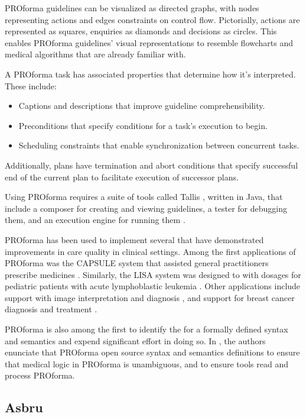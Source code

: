 PROforma guidelines can be visualized as directed graphs, with nodes representing
actions and edges constraints on control flow. Pictorially,
actions are represented as squares, enquiries as diamonds and
decisions as circles. This enables PROforma guidelines' visual representations
to resemble flowcharts and medical algorithms that \HCPs{} are already familiar
with.

A PROforma task has associated properties that determine how it's interpreted.
These include:
\begin{itemize}
  \item Captions and descriptions that improve guideline comprehensibility.
  \item Preconditions that specify conditions for a task's execution to begin.
  \item Scheduling constraints that enable synchronization between concurrent
    tasks.
\end{itemize}
Additionally, plans have termination and abort conditions that specify
successful end of the current plan to facilitate execution of successor
plans.

Using PROforma requires a suite of tools called Tallis \cite{TallisUrl}, written in Java,
that include a composer for creating and viewing guidelines, a tester for
debugging them, and an execution engine for running them \cite{SuttonAMIA03}.

PROforma has been used to implement several \CDSSs{} that have demonstrated
improvements in care quality in clinical settings. Among the first applications
of PROforma was the CAPSULE system that assisted general practitioners prescribe
medicines \cite{WaltonBMJ97}. Similarly, the LISA system was designed to \HCPs{} with
dosages for pediatric patients with acute lymphoblastic leukemia
\cite{BuryBJH05}. Other applications include support with image interpretation
and diagnosis \cite{TaylorMIA99}, and support for breast cancer diagnosis and
treatment \cite{FoxECAI06}.

PROforma is also among the first \DSLs{} to identify the for a formally defined
syntax and semantics and expend significant effort in doing so.
In \cite{SuttonAMIA03}, the authors enunciate
that PROforma  open source syntax and semantics definitions
to ensure that medical logic in PROforma is unambiguous, and to ensure
tools  read and process PROforma.

\subsection{Asbru}\label{sec:asbru}

